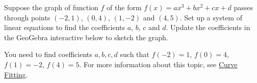 \documentclass{ximera}
\begin{document}
\begin{problem}\label{prob_oct_sys_4}
    Suppose the graph of function $f$ of the form $f(x)=ax^3+bx^2+cx+d$ passes through points $(-2, 1)$, $(0, 4)$, $(1, -2)$ and $(4, 5)$.   Set up a system of linear equations to find the coefficients $a$, $b$, $c$ and $d$. Update the coefficients in the GeoGebra interactive below to sketch the graph.
    
    \begin{hint}
        You need to find coefficients $a, b, c, d$ such that $f(-2)=1$, $f(0)=4$, $f(1)=-2$, $f(4)=5$.  For more information about this topic, see \href{https://ximera.osu.edu/linearalgebradzv3/LinearAlgebraInteractiveIntro/APP-0070/main}{Curve Fitting}.
    \end{hint}
    

   \begin{center} 
    \end{center}
   
\end{problem}
\end{document}
